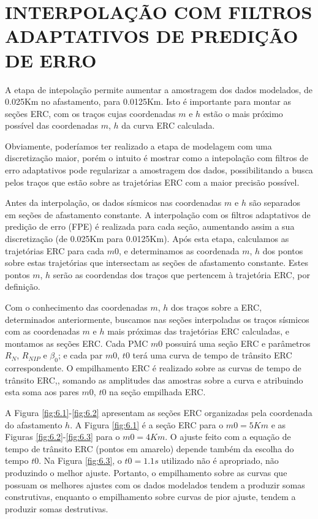 %
% 
% 
% 
% 
% 
% 

\chapter{INTERPOLAÇÃO COM FILTROS ADAPTATIVOS DE PREDIÇÃO DE ERRO}

A etapa de intepolação permite aumentar a amostragem dos dados modelados, de 0.025Km no afastamento, para 0.0125Km.
Isto é importante para montar as seções ERC, com os traços cujas coordenadas $m$ e $h$ estão o mais próximo possível
das coordenadas $m$, $h$ da curva ERC calculada.

Obviamente, poderíamos ter realizado a etapa de modelagem com uma discretização maior, porém o intuito é mostrar como
a intepolação com filtros de erro adaptativos pode regularizar a amostragem dos dados, possibilitando a busca pelos
traços que estão sobre as trajetórias ERC com a maior precisão possível.

Antes da interpolação, os dados sísmicos nas coordenadas $m$ e $h$ são separados em seções de afastamento constante.
A interpolação com os filtros adaptativos de predição de erro (FPE) é realizada para cada seção, aumentando assim a
sua discretização (de 0.025Km para 0.0125Km). Após esta etapa, calculamos as trajetórias ERC para cada $m0$, e determinamos
as coordenada $m$, $h$ dos pontos sobre estas trajetórias que intersectam as seções de afastamento constante. Estes pontos
$m$, $h$ serão as coordendas dos traços que pertencem à trajetória ERC, por definição.

Com o conhecimento das coordenadas $m$, $h$ dos traços sobre a ERC, determinados anteriormente, buscamos nas seções interpoladas
os traços sísmicos com as coordenadas $m$ e $h$ mais próximas das trajetórias ERC calculadas, e montamos as seções ERC. 
Cada PMC $m0$ possuirá uma seção ERC e parâmetros $R_N$, $R_{NIP}$ e $\beta_0$; e cada par $m0$, $t0$ terá uma curva de tempo
de trânsito ERC correspondente. O empilhamento ERC é realizado sobre as curvas de tempo de trânsito ERC,, somando as amplitudes
das amostras sobre a curva e atribuindo esta soma aos pares $m0$, $t0$ na seção empilhada ERC.

A Figura \ref{fig:6.1}-\ref{fig:6.2} apresentam as seções ERC organizadas pela coordenada do afastamento $h$. A Figura
\ref{fig:6.1} é a seção ERC para o $m0=5Km$ e as Figuras \ref{fig:6.2}-\ref{fig:6.3} para o $m0=4Km$. O ajuste feito com
a equação de tempo de trânsito ERC (pontos em amarelo) depende também da escolha do tempo $t0$. Na Figura \ref{fig:6.3}, 
o $t0=1.1s$ utilizado não é apropriado, não produzindo o melhor ajuste. Portanto, o empilhamento sobre as curvas que possuam
os melhores ajustes com os dados modelados tendem a produzir somas construtivas, enquanto o empilhamento sobre curvas de
pior ajuste, tendem a produzir somas destrutivas.

